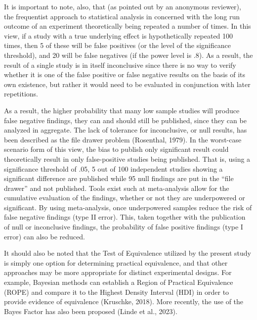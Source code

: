 \documentclass[
  man,floatsintext]{apa6}
\begin{document}
It is important to note, also, that (as pointed out by an anonymous reviewer), the frequentist approach to statistical analysis in concerned with the long run outcome of an experiment theoretically being repeated a number of times.
In this view, if a study with a true underlying effect is hypothetically repeated 100 times, then 5 of these will be false positives (or the level of the significance threshold), and 20 will be false negatives (if the power level is .8).
As a result, the result of a single study is in itself inconclusive since there is no way to verify whether it is one of the false positive or false negative results on the basis of its own existence, but rather it would need to be evaluated in conjunction with later repetitions.

As a result, the higher probability that many low sample studies will produce false negative findings, they can and should still be published, since they can be analyzed in aggregate.
The lack of tolerance for inconclusive, or null results, has been described as the file drawer problem (Rosenthal, 1979).
In the worst-case scenario form of this view, the bias to publish only significant result could theoretically result in only false-positive studies being published.
That is, using a significance threshold of .05, 5 out of 100 independent studies showing a significant difference are published while 95 null findings are put in the ``file drawer'' and not published.
Tools exist such at meta-analysis allow for the cumulative evaluation of the findings, whether or not they are underpowered or significant.
By using meta-analysis, once underpowered samples reduce the risk of false negative findings (type II error).
This, taken together with the publication of null or inconclusive findings, the probability of false positive findings (type I error) can also be reduced.

It should also be noted that the Test of Equivalence utilized by the present study is simply
one option for determining practical equivalence, and that other approaches may be more appropriate for distinct experimental designs.
For example, Bayesian methods can establish a Region of Practical Equivalence (ROPE) and compare it to the Highest Density Interval (HDI) in order to provide evidence of equivalence (Kruschke, 2018).
More recently, the use of the Bayes Factor has also been proposed (Linde et al., 2023).
\end{document}
